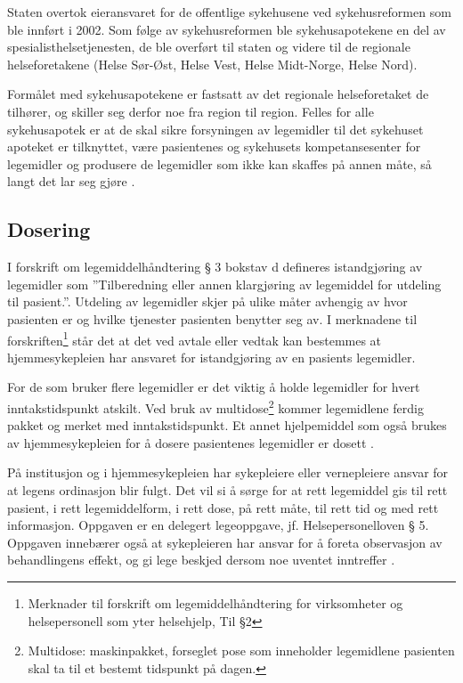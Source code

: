 Staten overtok eieransvaret for de offentlige sykehusene ved sykehusreformen som ble innført i 2002. Som følge av sykehusreformen ble sykehusapotekene en del av spesialisthelsetjenesten, de ble overført til staten og videre til de regionale helseforetakene (Helse Sør-Øst, Helse Vest, Helse Midt-Norge, Helse Nord). 

Formålet med sykehusapotekene er fastsatt av det regionale helseforetaket de tilhører, og skiller seg derfor noe fra region til region. Felles for alle sykehusapotek er at de skal sikre forsyningen av legemidler til det sykehuset apoteket er tilknyttet, være pasientenes og sykehusets kompetansesenter for legemidler og produsere de legemidler som ikke kan skaffes på annen måte, så langt det lar seg gjøre \citep{sykehusapotekenesOrganisering}. 

\subsection{Dosering}
I forskrift om legemiddelhåndtering § 3 bokstav d defineres istandgjøring av legemidler som ”Tilberedning eller annen klargjøring av legemiddel for utdeling til pasient.”. Utdeling av legemidler skjer på ulike måter avhengig av hvor pasienten er og hvilke tjenester pasienten benytter seg av. I merknadene til forskriften\footnote{Merknader til forskrift om legemiddelhåndtering for virksomheter og helsepersonell som yter helsehjelp, Til §2} står det at det ved avtale eller vedtak kan bestemmes at hjemmesykepleien har ansvaret for istandgjøring av en pasients legemidler. 

For de som bruker flere legemidler er det viktig å holde legemidler for hvert inntakstidspunkt atskilt. Ved bruk av multidose\footnote{Multidose: maskinpakket, forseglet pose som inneholder legemidlene pasienten skal ta til et bestemt tidspunkt på dagen.} kommer legemidlene ferdig pakket og merket med inntakstidspunkt. Et annet hjelpemiddel som også brukes av hjemmesykepleien for å dosere pasientenes legemidler er dosett \citep{HelsetilsynetRapport}. 

På institusjon og i hjemmesykepleien har sykepleiere eller vernepleiere ansvar for at legens ordinasjon blir fulgt. Det vil si å sørge for at rett legemiddel gis til rett pasient, i rett legemiddelform, i rett dose, på rett måte, til rett tid og med rett informasjon. Oppgaven er en delegert legeoppgave, jf. Helsepersonelloven § 5. Oppgaven innebærer også at sykepleieren har ansvar for å foreta observasjon av behandlingens effekt, og gi lege beskjed dersom noe uventet inntreffer \citep{IllustrertFarmakologi}. 

